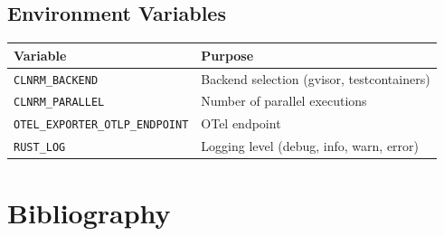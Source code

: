 \documentclass[12pt,twoside,openright]{book}
\theoremstyle{plain}
\theoremstyle{definition}
\theoremstyle{remark}
\begin{document}
\begin{appendices}
\section{Environment Variables}

\begin{table}[H]
\centering
\begin{tabular}{|l|l|}
\hline
\textbf{Variable} & \textbf{Purpose} \\
\hline
\texttt{CLNRM\_BACKEND} & Backend selection (gvisor, testcontainers) \\
\hline
\texttt{CLNRM\_PARALLEL} & Number of parallel executions \\
\hline
\texttt{OTEL\_EXPORTER\_OTLP\_ENDPOINT} & OTel endpoint \\
\hline
\texttt{RUST\_LOG} & Logging level (debug, info, warn, error) \\
\hline
\end{tabular}
\end{table}

\end{appendices}


\chapter*{Bibliography}
\end{document}
